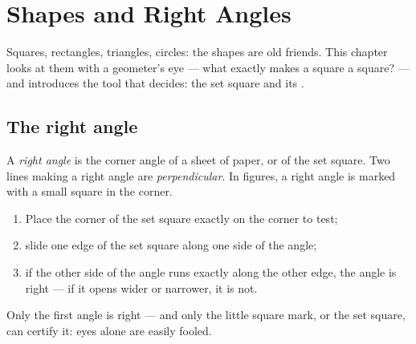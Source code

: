 \chapter{Shapes and Right Angles}\label{ch:g3:shapes}

Squares, rectangles, triangles, circles: the shapes are old friends.
This chapter looks at them with a geometer's eye --- what exactly
makes a square a square? --- and introduces the tool that decides:
the set square and its .

\section{The right angle}

\begin{definition}\label{def:g3:shapes:rightangle}
A \emph{right angle} is the corner angle of a
sheet of paper, or of the set square. Two lines making a right angle
are \emph{perpendicular}. In figures, a right angle is marked with a
small square in the corner.
\end{definition}

\begin{method}\label{met:g3:shapes:check}
\begin{enumerate}
  \item Place the corner of the set square exactly on the corner to
        test;
  \item slide one edge of the set square along one side of the angle;
  \item if the other side of the angle runs exactly along the other
        edge, the angle is right --- if it opens wider or narrower,
        it is not.
\end{enumerate}
\end{method}

\begin{omfigure}

{\small Only the first angle is right --- and only the little square
mark, or the set square, can certify it: eyes alone are easily
fooled.}
\end{omfigure}

